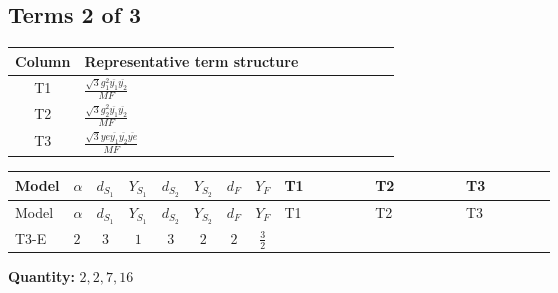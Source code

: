 \documentclass[8pt]{article}
\begin{document}
\begin{landscape}
\subsection*{Terms 2 of 3}
\begin{center}
\begin{tabular}{@{}c >{\raggedright\arraybackslash}p{0.82\linewidth}@{}}
\toprule
Column & Representative term structure \\
\midrule
T1 & \(\displaystyle \frac{\sqrt{3} g_{1}^{2} \overline{y_{1}} \overline{y_{2}}}{MF}\) \\
\midrule
T2 & \(\displaystyle \frac{\sqrt{3} g_{2}^{2} \overline{y_{1}} \overline{y_{2}}}{MF}\) \\
\midrule
T3 & \(\displaystyle \frac{\sqrt{3} ye \overline{y_{1}} \overline{y_{2}} \overline{ye}}{MF}\) \\
\midrule
\bottomrule
\end{tabular}
\end{center}
\smallskip
\tiny
\begin{longtable}{@{}llcccccc >{\raggedright\arraybackslash}p{0.21\linewidth} >{\raggedright\arraybackslash}p{0.21\linewidth} >{\raggedright\arraybackslash}p{0.21\linewidth}@{}}
\toprule
Model & $\alpha$ & $d_{S_1}$ & $Y_{S_1}$ & $d_{S_2}$ & $Y_{S_2}$ & $d_F$ & $Y_F$ & T1 & T2 & T3 \\
\midrule
\endfirsthead
\toprule
Model & $\alpha$ & $d_{S_1}$ & $Y_{S_1}$ & $d_{S_2}$ & $Y_{S_2}$ & $d_F$ & $Y_F$ & T1 & T2 & T3 \\
\midrule
\endhead
T3-E & $2$ & $3$ & $1$ & $3$ & $2$ & $2$ & $\frac{3}{2}$ & \scriptsize\adjustbox{max width=\linewidth}{$\begin{gathered} \frac{9 \sqrt{3} g_{1}^{2} \overline{y_{1}} \overline{y_{2}}}{8 MF}\end{gathered}$} & \scriptsize\adjustbox{max width=\linewidth}{$\begin{gathered} \frac{49 \sqrt{3} g_{2}^{2} \overline{y_{1}} \overline{y_{2}}}{24 MF}\end{gathered}$} & \scriptsize\adjustbox{max width=\linewidth}{$\begin{gathered} - \frac{\sqrt{3} ye \overline{y_{1}} \overline{y_{2}} \overline{ye}}{12 MF}\end{gathered}$} \\
\midrule
\bottomrule
\end{longtable}
\clearpage
\noindent\textbf{Quantity: }$\mathrm{2,2,7,16}$\par\smallskip

\end{landscape}
\end{document}
